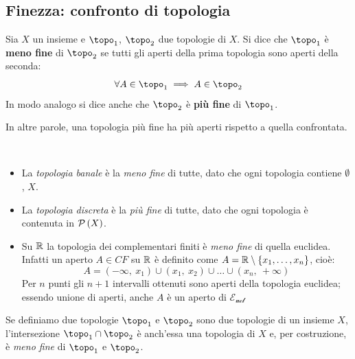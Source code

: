 \subsection{Finezza: confronto di topologia}
\begin{define}
Sia $X$ un insieme e $\topo_1$, $\topo_2$ due topologie di $X$. Si dice che $\topo_1$ è \textbf{meno fine} di $\topo_2$ se tutti gli aperti della prima topologia sono aperti della seconda:
\begin{equation}
\forall A\in\topo_1\implies A\in \topo_2
\end{equation}
In modo analogo si dice anche che $\topo_2$ è \textbf{più fine} di $\topo_1$.
\end{define}
In altre parole, una topologia più fine ha più aperti rispetto a quella confrontata.
\begin{examples}~{}
\begin{itemize}
\item La \textit{topologia banale} è la \textit{meno fine} di tutte, dato che ogni topologia contiene $\emptyset$, $X$.
\item La \textit{topologia discreta} è la \textit{più fine} di tutte, dato che ogni topologia è contenuta in $\mathcal{P}\left(X\right)$.
\item Su $\mathbb{R}$ la topologia dei complementari finiti è \textit{meno fine} di quella euclidea. Infatti un aperto $A\in CF$ su $\mathbb{R}$ è definito come $A=\mathbb{R}\setminus\left\{x_1,\ldots,x_n\right\}$, cioè:
\begin{equation*}
A=\left(-\infty,\ x_1\right)\cup\left(x_1,\ x_2\right)\cup\ldots\cup\left(x_n,\ +\infty\right)
\end{equation*}
Per $n$ punti gli $n+1$ intervalli ottenuti sono aperti della topologia euclidea; essendo unione di aperti, anche $A$ è un aperto di $\mathcal{E_{ucl}}$
\end{itemize}
\end{examples}
\begin{observe}\label{intersezionetopo}
	Se definiamo due topologie $\topo_1$ e $\topo_2$ sono due topologie di un insieme $X$, l'intersezione $\topo_1\cap\topo_2$ è anch'essa una topologia di $X$ e, per costruzione, è \textit{meno fine} di $\topo_1$ e $\topo_2$.
\end{observe}
